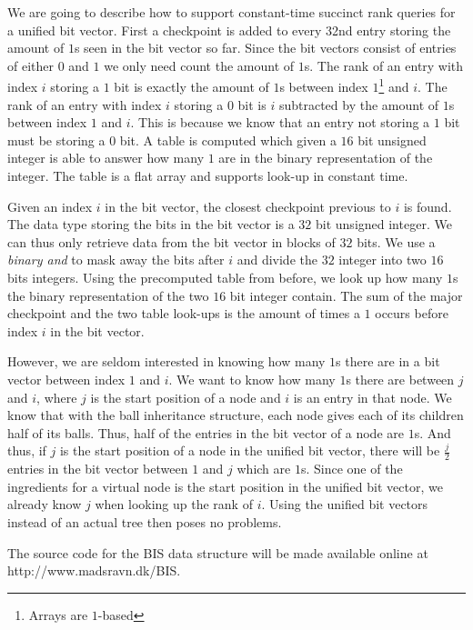 We are going to describe how to support constant-time succinct rank queries for a unified bit vector. First a checkpoint is added to every 32nd entry storing the amount of $1$s seen in the bit vector so far. Since the bit vectors consist of entries of either $0$ and $1$ we only need count the amount of $1$s. The rank of an entry with index $i$ storing a $1$ bit is exactly the amount of $1$s between index $1$\footnote{Arrays are $1$-based} and $i$. The rank of an entry with index $i$ storing a $0$ bit is $i$ subtracted by the amount of $1$s between index $1$ and $i$. This is because we know that an entry not storing a $1$ bit must be storing a $0$ bit. A table is computed which given a $16$ bit unsigned integer is able to answer how many $1$ are in the binary representation of the integer. The table is a flat array and supports look-up in constant time.

Given an index $i$ in the bit vector, the closest checkpoint previous to $i$ is found. The data type storing the bits in the bit vector is a $32$ bit unsigned integer. We can thus only retrieve data from the bit vector in blocks of $32$ bits. We use a \emph{binary and} to mask away the bits after $i$ and divide the $32$ integer into two $16$ bits integers. Using the precomputed table from before, we look up how many $1$s the binary representation of the two $16$ bit integer contain. The sum of the major checkpoint and the two table look-ups is the amount of times a $1$ occurs before index $i$ in the bit vector. 

However, we are seldom interested in knowing how many $1$s there are in a bit vector between index $1$ and $i$. We want to know how many $1$s there are between $j$ and $i$, where $j$ is the start position of a node and $i$ is an entry in that node. We know that with the ball inheritance structure, each node gives each of its children half of its balls. Thus, half of the entries in the bit vector of a node are $1$s. And thus, if $j$ is the start position of a node in the unified bit vector, there will be $\frac{j}{2}$ entries in the bit vector between $1$ and $j$ which are $1$s. Since one of the ingredients for a virtual node is the start position in the unified bit vector, we already know $j$ when looking up the rank of $i$. Using the unified bit vectors instead of an actual tree then poses no problems.

The source code for the BIS data structure will be made available online at http://www.madsravn.dk/BIS.

